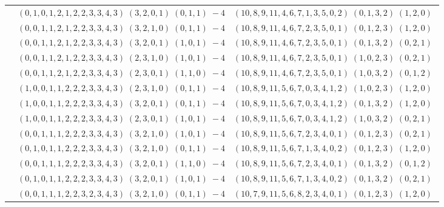 \documentclass[11pt]{article}
\begin{document}
\begin{longtable}[l]{|c|c|c|}
 \cline{2-3} 
 & $(0 ,1 ,0 ,1 ,2 ,1 ,2 ,2 ,3 ,3 ,4 ,3) \;(3 ,2 ,0 ,1) \;(0 ,1 ,1) \;-4$ & $(10 ,8 ,9 ,11 ,4 ,6 ,7 ,1 ,3 ,5 ,0 ,2) \;(0 ,1 ,3 ,2) \;(1 ,2 ,0) \;$\\ 
 \cline{2-3} 
 & $(0 ,0 ,1 ,1 ,2 ,1 ,2 ,2 ,3 ,3 ,4 ,3) \;(3 ,2 ,1 ,0) \;(0 ,1 ,1) \;-4$ & $(10 ,8 ,9 ,11 ,4 ,6 ,7 ,2 ,3 ,5 ,0 ,1) \;(0 ,1 ,2 ,3) \;(1 ,2 ,0) \;$\\ 
 \cline{2-3} 
 & $(0 ,0 ,1 ,1 ,2 ,1 ,2 ,2 ,3 ,3 ,4 ,3) \;(3 ,2 ,0 ,1) \;(1 ,0 ,1) \;-4$ & $(10 ,8 ,9 ,11 ,4 ,6 ,7 ,2 ,3 ,5 ,0 ,1) \;(0 ,1 ,3 ,2) \;(0 ,2 ,1) \;$\\ 
 \cline{2-3} 
 & $(0 ,0 ,1 ,1 ,2 ,1 ,2 ,2 ,3 ,3 ,4 ,3) \;(2 ,3 ,1 ,0) \;(1 ,0 ,1) \;-4$ & $(10 ,8 ,9 ,11 ,4 ,6 ,7 ,2 ,3 ,5 ,0 ,1) \;(1 ,0 ,2 ,3) \;(0 ,2 ,1) \;$\\ 
 \cline{2-3} 
 & $(0 ,0 ,1 ,1 ,2 ,1 ,2 ,2 ,3 ,3 ,4 ,3) \;(2 ,3 ,0 ,1) \;(1 ,1 ,0) \;-4$ & $(10 ,8 ,9 ,11 ,4 ,6 ,7 ,2 ,3 ,5 ,0 ,1) \;(1 ,0 ,3 ,2) \;(0 ,1 ,2) \;$\\ 
 \cline{2-3} 
 & $(1 ,0 ,0 ,1 ,1 ,2 ,2 ,2 ,3 ,3 ,4 ,3) \;(2 ,3 ,1 ,0) \;(0 ,1 ,1) \;-4$ & $(10 ,8 ,9 ,11 ,5 ,6 ,7 ,0 ,3 ,4 ,1 ,2) \;(1 ,0 ,2 ,3) \;(1 ,2 ,0) \;$\\ 
 \cline{2-3} 
 & $(1 ,0 ,0 ,1 ,1 ,2 ,2 ,2 ,3 ,3 ,4 ,3) \;(3 ,2 ,0 ,1) \;(0 ,1 ,1) \;-4$ & $(10 ,8 ,9 ,11 ,5 ,6 ,7 ,0 ,3 ,4 ,1 ,2) \;(0 ,1 ,3 ,2) \;(1 ,2 ,0) \;$\\ 
 \cline{2-3} 
 & $(1 ,0 ,0 ,1 ,1 ,2 ,2 ,2 ,3 ,3 ,4 ,3) \;(2 ,3 ,0 ,1) \;(1 ,0 ,1) \;-4$ & $(10 ,8 ,9 ,11 ,5 ,6 ,7 ,0 ,3 ,4 ,1 ,2) \;(1 ,0 ,3 ,2) \;(0 ,2 ,1) \;$\\ 
 \cline{2-3} 
 & $(0 ,0 ,1 ,1 ,1 ,2 ,2 ,2 ,3 ,3 ,4 ,3) \;(3 ,2 ,1 ,0) \;(1 ,0 ,1) \;-4$ & $(10 ,8 ,9 ,11 ,5 ,6 ,7 ,2 ,3 ,4 ,0 ,1) \;(0 ,1 ,2 ,3) \;(0 ,2 ,1) \;$\\ 
 \cline{2-3} 
 & $(0 ,1 ,0 ,1 ,1 ,2 ,2 ,2 ,3 ,3 ,4 ,3) \;(3 ,2 ,1 ,0) \;(0 ,1 ,1) \;-4$ & $(10 ,8 ,9 ,11 ,5 ,6 ,7 ,1 ,3 ,4 ,0 ,2) \;(0 ,1 ,2 ,3) \;(1 ,2 ,0) \;$\\ 
 \cline{2-3} 
 & $(0 ,0 ,1 ,1 ,1 ,2 ,2 ,2 ,3 ,3 ,4 ,3) \;(3 ,2 ,0 ,1) \;(1 ,1 ,0) \;-4$ & $(10 ,8 ,9 ,11 ,5 ,6 ,7 ,2 ,3 ,4 ,0 ,1) \;(0 ,1 ,3 ,2) \;(0 ,1 ,2) \;$\\ 
 \cline{2-3} 
 & $(0 ,1 ,0 ,1 ,1 ,2 ,2 ,2 ,3 ,3 ,4 ,3) \;(3 ,2 ,0 ,1) \;(1 ,0 ,1) \;-4$ & $(10 ,8 ,9 ,11 ,5 ,6 ,7 ,1 ,3 ,4 ,0 ,2) \;(0 ,1 ,3 ,2) \;(0 ,2 ,1) \;$\\ 
 \cline{2-3} 
 & $(0 ,0 ,1 ,1 ,1 ,2 ,2 ,3 ,2 ,3 ,4 ,3) \;(3 ,2 ,1 ,0) \;(0 ,1 ,1) \;-4$ & $(10 ,7 ,9 ,11 ,5 ,6 ,8 ,2 ,3 ,4 ,0 ,1) \;(0 ,1 ,2 ,3) \;(1 ,2 ,0) \;$\\ 

\end{longtable}
\end{document}
